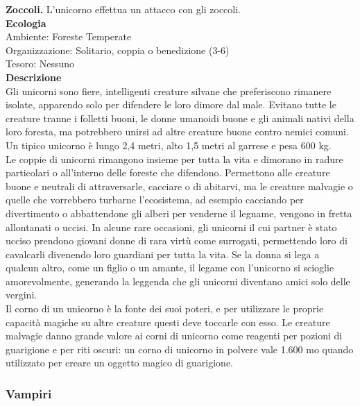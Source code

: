 \begin{multicols}{2}
\textbf{Zoccoli.} L'unicorno effettua un attacco con gli zoccoli.\\
\textbf{Ecologia}\\
Ambiente: Foreste Temperate\\
Organizzazione: Solitario, coppia o benedizione (3-6)\\
Tesoro: Nessuno\\
\textbf{Descrizione}\\
Gli unicorni sono fiere, intelligenti creature silvane che preferiscono rimanere isolate, apparendo solo per difendere le loro dimore dal male. Evitano tutte le creature tranne i folletti buoni, le donne umanoidi buone e gli animali nativi della loro foresta, ma potrebbero unirsi ad altre creature buone contro nemici comuni. Un tipico unicorno è lungo 2,4 metri, alto 1,5 metri al garrese e pesa 600 kg.\\

Le coppie di unicorni rimangono insieme per tutta la vita e dimorano in radure particolari o all'interno delle foreste che difendono. Permettono alle creature buone e neutrali di attraversarle, cacciare o di abitarvi, ma le creature malvagie o quelle che vorrebbero turbarne l'ecosistema, ad esempio cacciando per divertimento o abbattendone gli alberi per venderne il legname, vengono in fretta allontanati o uccisi. In alcune rare occasioni, gli unicorni il cui partner è stato ucciso prendono giovani donne di rara virtù come surrogati, permettendo loro di cavalcarli divenendo loro guardiani per tutta la vita. Se la donna si lega a qualcun altro, come un figlio o un amante, il legame con l'unicorno si scioglie amorevolmente, generando la leggenda che gli unicorni diventano amici solo delle vergini.\\

Il corno di un unicorno è la fonte dei suoi poteri, e per utilizzare le proprie capacità magiche su altre creature questi deve toccarle con esso. Le creature malvagie danno grande valore ai corni di unicorno come reagenti per pozioni di guarigione e per riti oscuri: un corno di unicorno in polvere vale 1.600 mo quando utilizzato per creare un oggetto magico di guarigione.\\

\subsubsection{Vampiri}


\end{multicols}

